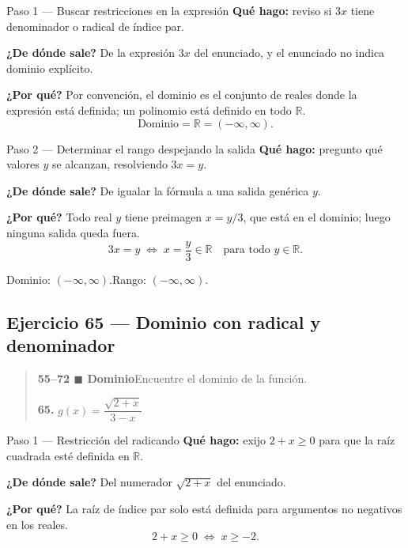 \documentclass[11pt]{article}
\begin{document}
\begin{paso}{Paso 1 --- Buscar restricciones en la expresión}
\textbf{Qué hago:} reviso si $3x$ tiene denominador o radical de índice par.

\textbf{¿De dónde sale?} De la expresión $3x$ del enunciado, y el enunciado no indica dominio explícito.

\textbf{¿Por qué?} Por convención, el dominio es el conjunto de reales donde la expresión está definida; un polinomio está definido en todo $\mathbb{R}$.
\[
\text{Dominio}=\mathbb{R}=(-\infty,\infty).
\]
\end{paso}

\begin{paso}{Paso 2 --- Determinar el rango despejando la salida}
\textbf{Qué hago:} pregunto qué valores $y$ se alcanzan, resolviendo $3x=y$.

\textbf{¿De dónde sale?} De igualar la fórmula a una salida genérica $y$.

\textbf{¿Por qué?} Todo real $y$ tiene preimagen $x=y/3$, que está en el dominio; luego ninguna salida queda fuera.
\[
3x=y \;\Longleftrightarrow\; x=\frac{y}{3}\in\mathbb{R}\quad\text{para todo } y\in\mathbb{R}.
\]
\end{paso}

\begin{resp}
Dominio: $(-\infty,\infty)$.\quad Rango: $(-\infty,\infty)$.
\end{resp}

\subsection*{Ejercicio 65 — Dominio con radical y denominador}

\begin{quote}
\textbf{55--72 $\blacksquare$ Dominio}\quad Encuentre el dominio de la función.

\textbf{65.} $g(x)=\dfrac{\sqrt{2+x}}{3-x}$
\end{quote}

\begin{paso}{Paso 1 --- Restricción del radicando}
\textbf{Qué hago:} exijo $2+x\ge0$ para que la raíz cuadrada esté definida en $\mathbb{R}$.

\textbf{¿De dónde sale?} Del numerador $\sqrt{2+x}$ del enunciado.

\textbf{¿Por qué?} La raíz de índice par solo está definida para argumentos no negativos en los reales.
\[
2+x\ge0 \;\Longleftrightarrow\; x\ge -2.
\]
\end{paso}
\end{document}
